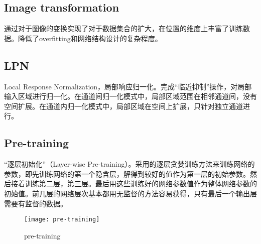 \subsection{Image transformation}
通过对于图像的变换实现了对于数据集合的扩大，在位置的维度上丰富了训练数据。降低了overfitting和网络结构设计的复杂程度。

\subsection{LPN}
Local Response Normalization，局部响应归一化。完成``临近抑制''操作，对局部输入区域进行归一化。在通道间归一化模式中，局部区域范围在相邻通道间，没有空间扩展。在通道内归一化模式中，局部区域在空间上扩展，只针对独立通道进行。

\subsection{Pre-training}
``逐层初始化''（Layer-wise Pre-training）。采用的逐层贪婪训练方法来训练网络的参数，即先训练网络的第一个隐含层，解得到较好的值作为第一层的初始参数。然后接着训练第二层，第三层。最后用这些训练好的网络参数值作为整体网络参数的初始值。前几层的网络层次基本都用无监督的方法容易获得，只有最后一个输出层需要有监督的数据。
\begin{figure}[!ht]
\centering
\texttt{[image: pre-training]}
\caption{pre-training}
\end{figure}

